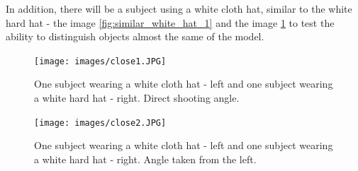 \documentclass[conference]{IEEEtran}
\begin{document}
In addition, there will be a subject using a white cloth hat, similar to the white hard hat - the image \ref{fig:similar_white_hat_1} and the image \ref{fig:similar_white_hat_2} to test the ability to distinguish objects almost the same of the model.
\begin{figure}[ht]
\centering
\begin{minipage}{0.45\textwidth}
\texttt{[image: images/close1.JPG]}
\caption{One subject wearing a white cloth hat - left and one subject wearing a white hard hat - right. Direct shooting angle.}
\label{fig:similar_white_hat_1}
\end{minipage}\hfill
\begin{minipage}{0.45\textwidth}
\texttt{[image: images/close2.JPG]}
\caption{One subject wearing a white cloth hat - left and one subject wearing a white hard hat - right. Angle taken from the left.}
\label{fig:similar_white_hat_2}
\end{minipage}
\end{figure}
\end{document}
